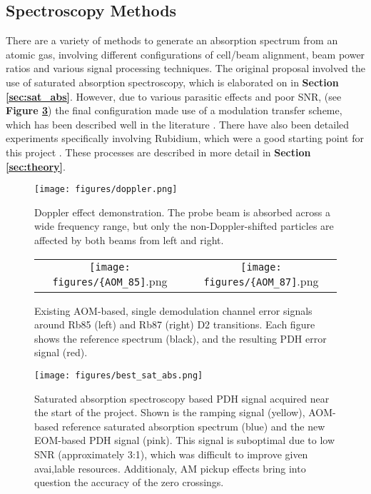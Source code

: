 \subsection{Spectroscopy Methods}

There are a variety of methods to generate an absorption spectrum from an atomic gas, involving different configurations of cell/beam alignment, beam power ratios and various signal processing techniques. The original proposal involved the use of saturated absorption spectroscopy, which is elaborated on in \textbf{Section \ref{sec:sat_abs}}. However, due to various parasitic effects and poor SNR, (see \textbf{Figure \ref{fig:sat_abs_bad}}) the final configuration made use of a modulation transfer scheme, which has been described well in the literature \cite{Shirley:82}. There have also been detailed experiments specifically involving Rubidium, which were a good starting point for this project \cite{0957-0233-19-10-105601}. These processes are described in more detail in \textbf{Section \ref{sec:theory}}.

\begin{figure}
    \centering
    \texttt{[image: figures/doppler.png]}
    \caption{Doppler effect demonstration.  The probe beam is absorbed across a wide frequency range, but only the non-Doppler-shifted particles are affected by both beams from left and right.}
    \label{fig:doppler}
\end{figure}

\begin{figure}
  \begin{tabular}{cc}
    \texttt{[image: figures/\{AOM\_85]}.png} &
    \texttt{[image: figures/\{AOM\_87]}.png} \\
  \end{tabular}
  \caption{Existing AOM-based, single demodulation channel error signals around Rb85 (left) and Rb87 (right) D2 transitions. Each figure shows the reference spectrum (black), and the resulting PDH error signal (red).}
  \label{fig:aom_spectra}
\end{figure}

\begin{figure}
    \centering
    \texttt{[image: figures/best\_sat\_abs.png]}
    \caption{Saturated absorption spectroscopy based PDH signal acquired near the start of the project. Shown is the ramping signal (yellow), AOM-based reference saturated absorption spectrum (blue) and the new EOM-based PDH signal (pink). This signal is suboptimal due to low SNR (approximately 3:1), which was difficult to improve given avai,lable resources. Additionaly, AM pickup effects bring into question the accuracy of the zero crossings.}
    \label{fig:sat_abs_bad}
\end{figure}
